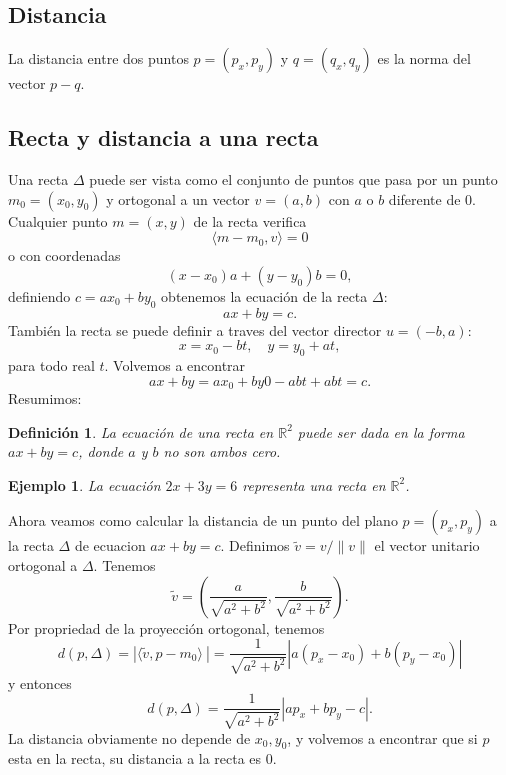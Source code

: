 \documentclass[11pt]{book}
\theoremstyle{definicion}
\theoremstyle{teorema}
\theoremstyle{ejemplo}
\newtheorem{definition}{Definición}
\newtheorem{example}{Ejemplo}
\begin{document}
\subsection{Distancia}

\noindent
La distancia entre dos puntos $p=(p_x,p_y)$ y $q=(q_x,q_y)$ es la norma del vector $p-q$.

\subsection{Recta y distancia a una recta}

Una recta $\Delta$ puede ser vista como el conjunto de puntos que pasa por un punto $m_0=(x_0,y_0)$ y ortogonal a un vector $v=(a,b)$ con $a$ o $b$ diferente de $0$. Cualquier punto $m=(x,y)$ de la recta verifica
\[
\langle m - m_0 , v \rangle = 0
\]
o con coordenadas
\[
(x-x_0)a + (y-y_0)b = 0,
\]
definiendo $c=a x_0 + b y_0$ obtenemos
la ecuaci\'on de la recta $\Delta$:
\[
a x + b y = c.
\]
Tambi\'en la recta se puede definir a traves del vector director $u=(-b,a)$:
\[
x = x_0 - b t, \quad y = y_0 + a t,
\]
para todo real $t$. Volvemos a encontrar
\[
a x + by = a x_0 + b y0 -abt + abt = c. 
\]
Resumimos:
\begin{definition}
La ecuación de una recta en \(\mathbb{R}^2\) puede ser dada en la forma \(ax + by = c\), donde \(a\) y \(b\) no son ambos cero.
\end{definition}

\begin{example}
La ecuación \(2x + 3y = 6\) representa una recta en \(\mathbb{R}^2\).
\end{example}

Ahora veamos como calcular la distancia de un punto del plano $p=(p_x,p_y)$ a la recta $\Delta$ de ecuacion $ax + by = c$. Definimos $\tilde v = v / \| v \|$ el vector unitario ortogonal a $\Delta$. Tenemos
\[
\tilde v = \left ( 
\frac{a}{\sqrt{a^2+b^2}},
\frac{b}{\sqrt{a^2+b^2}} \right ).
\]
Por propriedad de la proyecci\'on ortogonal, tenemos
\[
d(p,\Delta)= 
\left | \langle \tilde v, p - m_0 \rangle \ \right |
= \frac{1}{\sqrt{a^2+b^2}}
\left | a (p_x - x_0) + b (p_y - x_0 ) \right |
\]
y entonces
\[
d(p,\Delta)= 
\frac{1}{\sqrt{a^2+b^2}}
\left | a p_x + b p_y - c \right |.
\]
La distancia obviamente no depende de $x_0,y_0$, y volvemos a encontrar que si $p$ esta en la recta, su distancia a la recta es $0$.
\end{document}
